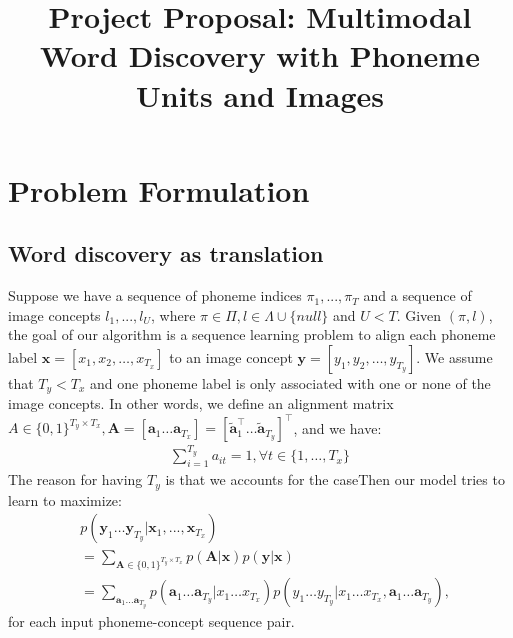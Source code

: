 \documentclass[a4paper]{article}
\title{Project Proposal: Multimodal Word Discovery with Phoneme Units and Images}
\begin{document}
\maketitle

\section{Problem Formulation}
\subsection{Word discovery as translation}
Suppose we have a sequence of phoneme indices $\pi_1, ..., \pi_T$ and a sequence of image concepts $l_1, ..., l_U$, where $\pi \in \Pi, l \in \Lambda\cup \{null\}$ and $U < T$. Given $(\pi, l)$, the goal of our algorithm is a sequence learning problem to align each phoneme label $\mathbf{x} = [x_1, x_2, \ldots, x_{T_x}]$ to an image concept $\mathbf{y} = [y_1, y_2, \ldots, y_{T_y}]$. We assume that $T_y < T_x$ and one phoneme label is only associated with one or none of the image concepts. In other words, we define an alignment matrix $A \in \{0, 1\}^{T_y  \times T_x}, \mathbf{A} = [\mathbf{a}_1 \ldots \mathbf{a}_{T_x}] = [\tilde{\mathbf a}_1^{\top} \ldots \tilde{\mathbf a}_{T_y}]^\top$, and we have:
\begin{align}\label{eq:cluster_constraint}
\sum_{i=1}^{T_y} a_{it} = 1, \forall t \in \{1, \ldots, T_x\}
\end{align}
The reason for having 
$T_y$ is that we accounts for the caseThen our model tries to learn to maximize:
\begin{align}\label{eq:trans_prob}
    &p(\mathbf{y}_1\ldots \mathbf{y}_{T_y}|\mathbf{x}_1,...,\mathbf{x}_{T_x})\\ 
    &= \sum_{\mathbf{A}\in \{0, 1\}^{T_y  \times T_x}} p(\mathbf{A}|\mathbf{x}) p(\mathbf{y}|\mathbf{x})\\
    &= \sum_{\mathbf{a}_1\ldots\mathbf{a}_{T_y}} p(\mathbf{a}_1\ldots\mathbf{a}_{T_y}|x_1\ldots x_{T_x}) p(y_1\ldots y_{T_y}|x_1\ldots x_{T_x}, \mathbf{a}_1\ldots \mathbf{a}_{T_y}),
\end{align}
for each input phoneme-concept sequence pair. 
\end{document}
